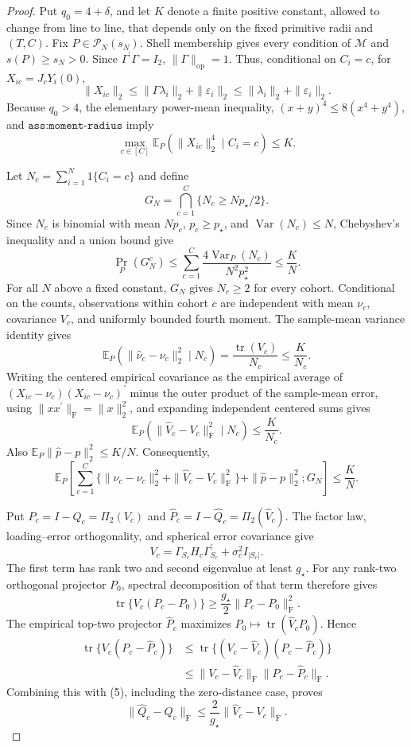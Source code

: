 \documentclass{article}
\begin{document}
\begin{proof}
Put \(q_0=4+\delta\), and let \(K\) denote a finite positive constant, allowed to change from line to line, that depends only on the fixed primitive radii and \((T,C)\). Fix \(P\in\mathcal P_N(s_N)\). Shell membership gives every condition of \(\mathcal M\) and \(s(P)\geq s_N>0\). Since \(\Gamma^{\prime}\Gamma=I_2\), \(\|\Gamma\|_{\mathrm{op}}=1\). Thus, conditional on \(C_i=c\), for \(X_{ic}=J_cY_i(0)\),
\[
\|X_{ic}\|_2
\leq\|\Gamma\lambda_i\|_2+\|\varepsilon_i\|_2
\leq\|\lambda_i\|_2+\|\varepsilon_i\|_2.
\]
Because \(q_0>4\), the elementary power-mean inequality, \((x+y)^4\leq8(x^4+y^4)\), and \(\texttt{ass:moment-radius}\) imply
\[
\max_{c\in[C]}\mathbb E_P(\|X_{ic}\|_2^4\mid C_i=c)\leq K.
\tag{1}
\]

Let \(N_c=\sum_{i=1}^N1\{C_i=c\}\) and define
\[
G_N=\bigcap_{c=1}^C\{N_c\geq Np_\star/2\}.
\]
Since \(N_c\) is binomial with mean \(Np_c\), \(p_c\geq p_\star\), and \(\operatorname{Var}(N_c)\leq N\), Chebyshev's inequality and a union bound give
\[
\Pr_P(G_N^c)
\leq\sum_{c=1}^C\frac{4\operatorname{Var}_P(N_c)}{N^2p_\star^2}
\leq\frac K N.
\tag{2}
\]
For all \(N\) above a fixed constant, \(G_N\) gives \(N_c\geq2\) for every cohort. Conditional on the counts, observations within cohort \(c\) are independent with mean \(\nu_c\), covariance \(V_c\), and uniformly bounded fourth moment. The sample-mean variance identity gives
\[
\mathbb E_P(\|\widehat\nu_c-\nu_c\|_2^2\mid N_c)
=\frac{\operatorname{tr}(V_c)}{N_c}\leq\frac K{N_c}.
\]
Writing the centered empirical covariance as the empirical average of \((X_{ic}-\nu_c)(X_{ic}-\nu_c)^{\prime}\) minus the outer product of the sample-mean error, using \(\|xx^{\prime}\|_{\mathrm F}=\|x\|_2^2\), and expanding independent centered sums gives
\[
\mathbb E_P(\|\widehat V_c-V_c\|_{\mathrm F}^2\mid N_c)
\leq\frac K{N_c}.
\]
Also \(\mathbb E_P\|\widehat p-p\|_2^2\leq K/N\). Consequently,
\[
\mathbb E_P\!\left[
\sum_{c=1}^C\{\|\widehat\nu_c-\nu_c\|_2^2
+\|\widehat V_c-V_c\|_{\mathrm F}^2\}
+\|\widehat p-p\|_2^2;G_N\right]
\leq\frac K N.
\tag{3}
\]

Put \(P_c=I-Q_c=\Pi_2(V_c)\) and \(\widehat P_c=I-\widehat Q_c=\Pi_2(\widehat V_c)\). The factor law, loading--error orthogonality, and spherical error covariance give
\[
V_c=\Gamma_{S_c}H_c\Gamma_{S_c}^{\prime}+\sigma_c^2I_{|S_c|}.
\tag{4}
\]
The first term has rank two and second eigenvalue at least \(g_\star\). For any rank-two orthogonal projector \(P_0\), spectral decomposition of that term therefore gives
\[
\operatorname{tr}\{V_c(P_c-P_0)\}
\geq\frac{g_\star}{2}\|P_c-P_0\|_{\mathrm F}^2.
\tag{5}
\]
The empirical top-two projector \(\widehat P_c\) maximizes \(P_0\mapsto\operatorname{tr}(\widehat V_cP_0)\). Hence
\[
\begin{aligned}
\operatorname{tr}\{V_c(P_c-\widehat P_c)\}
&\leq\operatorname{tr}\{(V_c-\widehat V_c)(P_c-\widehat P_c)\}\\
&\leq\|V_c-\widehat V_c\|_{\mathrm F}\|P_c-\widehat P_c\|_{\mathrm F}.
\end{aligned}
\]
Combining this with (5), including the zero-distance case, proves
\[
\|\widehat Q_c-Q_c\|_{\mathrm F}
\leq\frac{2}{g_\star}\|\widehat V_c-V_c\|_{\mathrm F}.
\tag{6}
\]


\end{proof}
\end{document}

